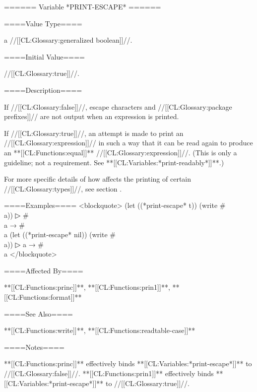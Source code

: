 ====== Variable *PRINT-ESCAPE* ======

====Value Type====

a //[[CL:Glossary:generalized boolean]]//.

====Initial Value====

//[[CL:Glossary:true]]//.

====Description====

If //[[CL:Glossary:false]]//, escape characters and //[[CL:Glossary:package prefixes]]// are not output when an expression is printed.


If //[[CL:Glossary:true]]//, an attempt is made to print an //[[CL:Glossary:expression]]// in such a way that it can be read again to produce an **[[CL:Functions:equal]]** //[[CL:Glossary:expression]]//. (This is only a guideline; not a requirement. See **[[CL:Variables:*print-readably*]]**.)

For more specific details of how  affects the printing of certain //[[CL:Glossary:types]]//, see section {\secref\DefaultPrintObjMeths}.

====Examples==== <blockquote> (let ((*print-escape* t)) (write #\\a))
▷ #\\a → #\\a (let ((*print-escape* nil)) (write #\\a))
▷ a → #\\a </blockquote>

====Affected By====

**[[CL:Functions:princ]]**, **[[CL:Functions:prin1]]**, **[[CL:Functions:format]]**

====See Also====

**[[CL:Functions:write]]**, **[[CL:Functions:readtable-case]]**

====Notes====

**[[CL:Functions:princ]]** effectively binds **[[CL:Variables:*print-escape*]]** to //[[CL:Glossary:false]]//. **[[CL:Functions:prin1]]** effectively binds **[[CL:Variables:*print-escape*]]** to //[[CL:Glossary:true]]//.


